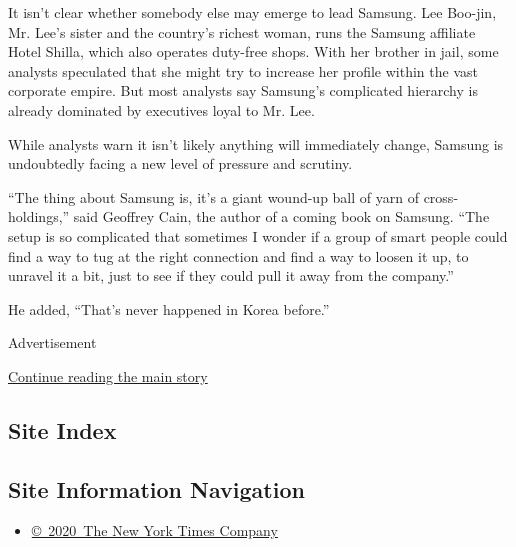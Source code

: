 It isn't clear whether somebody else may emerge to lead Samsung. Lee
Boo-jin, Mr. Lee's sister and the country's richest woman, runs the
Samsung affiliate Hotel Shilla, which also operates duty-free shops.
With her brother in jail, some analysts speculated that she might try to
increase her profile within the vast corporate empire. But most analysts
say Samsung's complicated hierarchy is already dominated by executives
loyal to Mr. Lee.

While analysts warn it isn't likely anything will immediately change,
Samsung is undoubtedly facing a new level of pressure and scrutiny.

``The thing about Samsung is, it's a giant wound-up ball of yarn of
cross-holdings,'' said Geoffrey Cain, the author of a coming book on
Samsung. ``The setup is so complicated that sometimes I wonder if a
group of smart people could find a way to tug at the right connection
and find a way to loosen it up, to unravel it a bit, just to see if they
could pull it away from the company.''

He added, ``That's never happened in Korea before.''

Advertisement

\protect\hyperlink{after-bottom}{Continue reading the main story}

\hypertarget{site-index}{%
\subsection{Site Index}\label{site-index}}

\hypertarget{site-information-navigation}{%
\subsection{Site Information
Navigation}\label{site-information-navigation}}

\begin{itemize}
\tightlist
\item
  \href{https://help.nytimes3xbfgragh.onion/hc/en-us/articles/115014792127-Copyright-notice}{©~2020~The
  New York Times Company}
\end{itemize}

